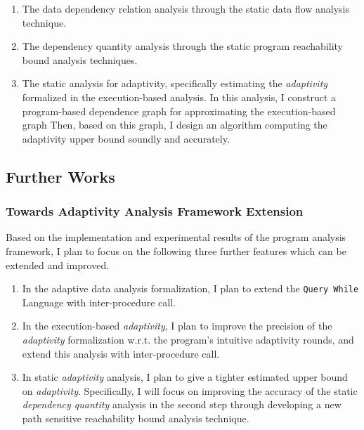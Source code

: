 \begin{enumerate}
\begin{enumerate}
\item The data dependency relation analysis through the static data flow analysis technique.
\item The dependency quantity analysis through the static program reachability bound analysis techniques.
\item 
The static analysis for adaptivity, specifically estimating the \emph{adaptivity} formalized in the execution-based analysis.
In this analysis, I construct a program-based dependence graph for approximating the execution-based graph
Then, based on this graph, I design an algorithm
computing the adaptivity upper bound soundly 
and accurately.
\end{enumerate}
\end{enumerate}%


\subsection{Further Works}
\subsubsection{Towards Adaptivity Analysis Framework Extension}
\label{subsec:intro-improve}
Based on the implementation and experimental results of the program analysis framework,
I plan to focus on the following three further features which can be extended and improved.
\begin{enumerate}
    \item In the adaptive data analysis formalization, I plan to extend the {\tt Query While} Language with inter-procedure call.
    \item In the execution-based \emph{adaptivity},
    I plan to improve the precision of the \emph{adaptivity} formalization w.r.t. the program's intuitive adaptivity rounds,
and extend this analysis with inter-procedure call.
\item In static \emph{adaptivity} analysis, I plan to give a tighter estimated upper bound on \emph{adaptivity}.
Specifically, I will focus on improving the accuracy of the static \emph{dependency quantity} analysis in the second step through 
developing a new path sensitive reachability bound analysis technique. 
\end{enumerate}
